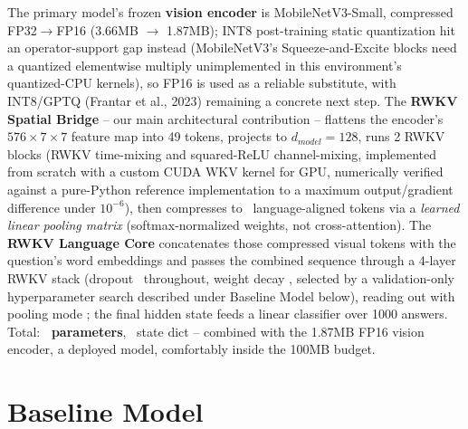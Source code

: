 \documentclass[final]{article}
\begin{document}
The primary model's frozen \textbf{vision encoder} is MobileNetV3-Small, compressed
FP32$\to$FP16 (3.66MB $\to$ 1.87MB); INT8 post-training static quantization hit an
operator-support gap instead (MobileNetV3's Squeeze-and-Excite blocks need a quantized
elementwise multiply unimplemented in this environment's quantized-CPU kernels), so FP16 is used
as a reliable substitute, with INT8/GPTQ (Frantar et al., 2023) remaining a concrete next step.
The \textbf{RWKV Spatial Bridge} -- our main architectural contribution -- flattens the encoder's
$576\times7\times7$ feature map into 49 tokens, projects to $d_{model}=128$, runs 2 RWKV blocks
(RWKV time-mixing and squared-ReLU channel-mixing, implemented from scratch with a custom CUDA
WKV kernel for GPU, numerically verified against a pure-Python reference implementation to a
maximum output/gradient difference under $10^{-6}$), then compresses to \primaryTunedK\
language-aligned tokens via a \emph{learned linear pooling matrix} (softmax-normalized weights,
not cross-attention). The \textbf{RWKV Language Core} concatenates those compressed visual tokens
with the question's word embeddings and passes the combined sequence through a 4-layer RWKV stack
(dropout \primaryTunedDropout\ throughout, weight decay \primaryTunedWeightDecay, selected by a
validation-only hyperparameter search described under Baseline Model below), reading out with
pooling mode \primaryTunedPool; the final hidden state feeds a linear classifier over 1000
answers. Total: \textbf{\primaryParams\ parameters}, \primarySize\ state dict -- combined with the
1.87MB FP16 vision encoder, a \textbf{\primaryTotalSize} deployed model, comfortably inside the
100MB budget.

\section*{Baseline Model}
\end{document}
